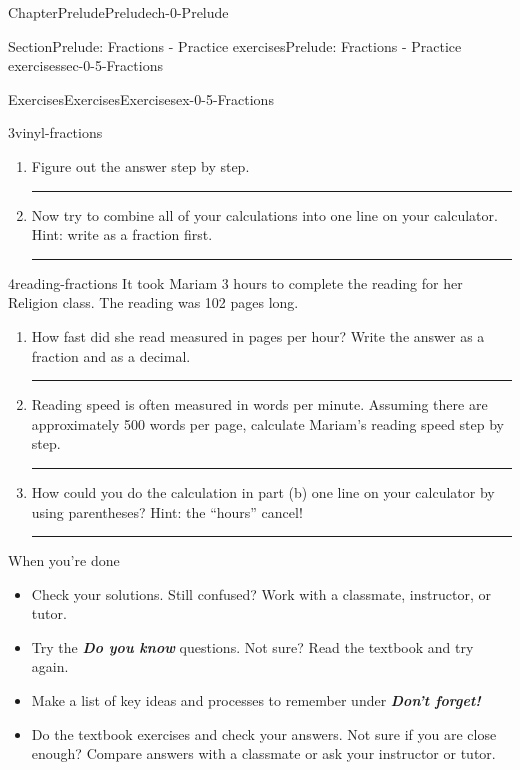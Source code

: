\documentclass[twoside,11pt,]{book}
\newcommand{\alert}[1]{\textbf{\textit{#1}}}
\newlength{\workspacestrutwidth}
\numberwithin{equation}{section}
\begin{document}
\begin{chapterptx}{Chapter}{Prelude}{}{Prelude}{}{}{ch-0-Prelude}
\begin{sectionptx}{Section}{Prelude: Fractions - Practice exercises}{}{Prelude: Fractions - Practice exercises}{}{}{sec-0-5-Fractions}
\begin{exercises-subsection-numberless}{Exercises}{Exercises}{}{Exercises}{}{}{ex-0-5-Fractions}
\begin{divisionexercise}{3}{}{}{vinyl-fractions}
\begin{enumerate}[label=(\alph*),ref=\alph*]%
\item{}Figure out the answer step by step.%
\par\rule{\workspacestrutwidth}{1.5in}%
\item{}Now try to combine all of your calculations into one line on your calculator. Hint: write as a fraction first.%
\par\rule{\workspacestrutwidth}{0.75in}%
\end{enumerate}%
\end{divisionexercise}%
 \begin{divisionexercise}{4}{}{}{reading-fractions}%
It took Mariam 3 hours to complete the reading for her Religion class. The reading was 102 pages long.%
\begin{enumerate}[label=(\alph*),ref=\alph*]%
\item{}How fast did she read measured in pages per hour? Write the answer as a fraction and as a decimal.%
\par\rule{\workspacestrutwidth}{0.75in}%
\item{}Reading speed is often measured in words per minute. Assuming there are approximately 500 words per page, calculate Mariam's reading speed step by step.%
\par\rule{\workspacestrutwidth}{1.5in}%
\item{}How could you do the calculation in part (b) one line on your calculator by using parentheses? Hint: the ``hours'' cancel!%
\par\rule{\workspacestrutwidth}{0.25in}%
\end{enumerate}%
\end{divisionexercise}%
\end{exercises-subsection-numberless}
\begin{conclusion}{When you're done \textellipsis{}}%
%
\begin{itemize}[label=\textbullet]
\item{}Check your solutions. Still confused? Work with a classmate, instructor, or tutor.%
\item{}Try the \alert{Do you know} questions. Not sure? Read the textbook and try again.%
\item{}Make a list of key ideas and processes to remember under \alert{Don't forget!}%
\item{}Do the textbook exercises and check your answers. Not sure if you are close enough? Compare answers with a classmate or ask your instructor or tutor.%

\end{itemize}
\end{conclusion}
\end{sectionptx}
\end{chapterptx}
\end{document}

